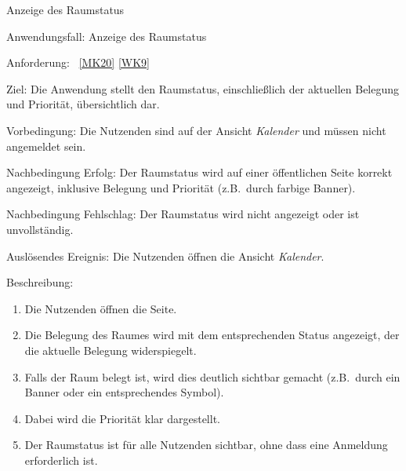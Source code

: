\begin{function}{80}{Anzeige des Raumstatus}
    \item[Anwendungsfall:] Anzeige des Raumstatus
    \item[Anforderung:] ~\ref{MK20} \ref{WK9}
    \item[Ziel:] Die Anwendung stellt den Raumstatus, einschließlich der aktuellen Belegung und Priorität, übersichtlich dar.
    \item[Vorbedingung:] Die Nutzenden sind auf der Ansicht \textit{Kalender} und müssen nicht angemeldet sein.
    \item[Nachbedingung Erfolg:] Der Raumstatus wird auf einer öffentlichen Seite korrekt angezeigt, inklusive Belegung und Priorität (z.B.\ durch farbige Banner).
    \item[Nachbedingung Fehlschlag:] Der Raumstatus wird nicht angezeigt oder ist unvollständig.
    \item[Auslösendes Ereignis:] Die Nutzenden öffnen die Ansicht \textit{Kalender}.
    \item[Beschreibung:] ~
    \begin{enumerate}
        \item Die Nutzenden öffnen die Seite.
        \item Die Belegung des Raumes wird mit dem entsprechenden Status angezeigt, der die aktuelle Belegung widerspiegelt.
        \item Falls der Raum belegt ist, wird dies deutlich sichtbar gemacht (z.B.\ durch ein Banner oder ein entsprechendes Symbol).
        \item Dabei wird die Priorität klar dargestellt.
        \item Der Raumstatus ist für alle Nutzenden sichtbar, ohne dass eine Anmeldung erforderlich ist.
    \end{enumerate}
\end{function}

\pagebreak

